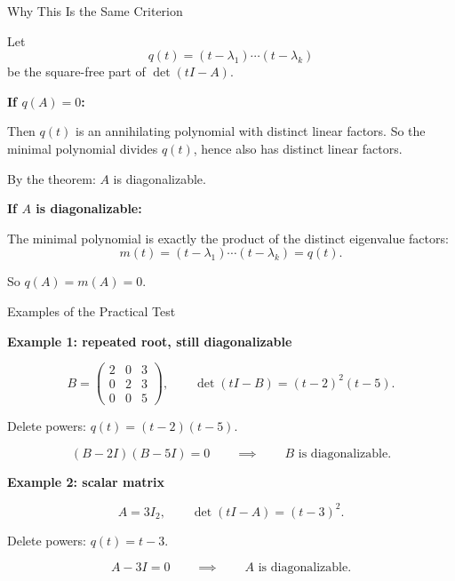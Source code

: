\documentclass[10pt]{beamer}
\theoremstyle{definition}
\newcommand{\x}[1]{\alert{\textbf{#1}}}
\begin{document}
\begin{frame}[shrink=5]{Why This Is the Same Criterion}

Let
$$q(t)=(t-\lambda_1)\cdots(t-\lambda_k)$$
be the square-free part of $\det(tI-A)$.

\vfill

\x{If $q(A)=0$:}

\smallskip

Then $q(t)$ is an annihilating polynomial with distinct linear factors.
So the minimal polynomial divides $q(t)$, hence also has distinct linear factors.

\vfill

By the theorem: $A$ is diagonalizable.

\vfill\pause

\x{If $A$ is diagonalizable:}

\smallskip

The minimal polynomial is exactly the product of the distinct eigenvalue factors:
$$m(t)=(t-\lambda_1)\cdots(t-\lambda_k)=q(t).$$

\vfill

So $q(A)=m(A)=0$.

\end{frame}


\begin{frame}[shrink=5]{Examples of the Practical Test}

\x{Example 1: repeated root, still diagonalizable}

$$B=\begin{pmatrix}2&0&3\\0&2&3\\0&0&5\end{pmatrix}, \qquad \det(tI-B)=(t-2)^2(t-5).$$

Delete powers: $q(t)=(t-2)(t-5)$.

$$(B-2I)(B-5I)=0 \qquad\implies\qquad B\text{ is diagonalizable.}$$

\vfill

\x{Example 2: scalar matrix}

$$A=3I_2, \qquad \det(tI-A)=(t-3)^2.$$

Delete powers: $q(t)=t-3$.

$$A-3I=0 \qquad\implies\qquad A\text{ is diagonalizable.}$$

\end{frame}
\end{document}

